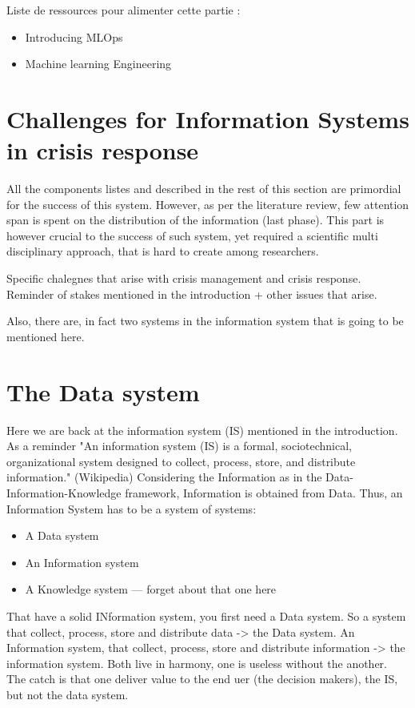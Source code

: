 Liste de ressources pour alimenter cette partie :
\begin{itemize}
    \item Introducing MLOps
    \item Machine learning Engineering
\end{itemize}

\section{Challenges for Information Systems in crisis response}
All the components listes and described in the rest of this section are primordial for the success of this system.
However, as per the literature review, few attention span is spent on the distribution of the information (last phase).
This part is however crucial to the success of such system, yet required a scientific multi disciplinary approach, that is hard to create among researchers.

Specific chalegnes that arise with crisis management and crisis response.
Reminder of stakes mentioned in the introduction + other issues that arise.

Also, there are, in fact two systems in the information system that is going to be mentioned here.


\section{The Data system}
Here we are back at the information system (IS) mentioned in the introduction.
As a reminder "An information system (IS) is a formal, sociotechnical, organizational system designed to collect, process, store, and distribute information." (Wikipedia)
Considering the Information as in the Data-Information-Knowledge framework, Information is obtained from Data.
Thus, an Information System has to be a system of systems:
\begin{itemize}
    \item A Data system
    \item An Information system
    \item A Knowledge system — forget about that one here
\end{itemize}
That have a solid INformation system, you first need a Data system.
So a system that collect, process, store and distribute data -> the Data system.
An Information system, that collect, process, store and distribute information -> the information system.
Both live in harmony, one is useless without the another.
The catch is that one deliver value to the end uer (the decision makers), the IS, but not the data system.

